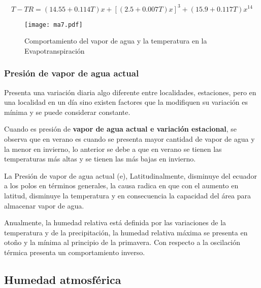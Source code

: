 \begin{equation}
    T - TR =\left(14.55 + 0.114T\right)x +\left[\left(2.5 + 0.007T\right)x\right]^3 +\left(15.9 + 0.117T\right)x^{14}
\end{equation}

\begin{figure}[h!]
\centering
  \texttt{[image: ma7.pdf]}
  \caption{Comportamiento del vapor de agua y la temperatura en la Evapotranspiración}
  \label{ma7}
\end{figure}\subsubsection{Presión de vapor de agua actual}
Presenta una variación diaria algo diferente entre localidades, estaciones, pero en una localidad en un día sino existen factores que la modifiquen su variación es mínima y se puede considerar constante.

Cuando es presión de \textbf{vapor de agua actual e variación estacional}, se observa que en verano es cuando se presenta mayor cantidad de vapor de agua y la menor en invierno, lo anterior se debe a que en verano se tienen las temperaturas más altas y se tienen las más bajas en invierno.

La Presión de vapor de agua actual (e), Latitudinalmente, disminuye del ecuador a los polos en términos generales, la causa radica en que con el aumento en latitud, disminuye la temperatura y en consecuencia la capacidad del área para almacenar vapor de agua.

Anualmente, la humedad relativa está definida por las variaciones de la temperatura y de la precipitación, la humedad relativa máxima se presenta en otoño y la mínima al principio de la primavera. Con respecto a la oscilación térmica presenta un comportamiento inverso.

\subsection{Humedad atmosférica}

